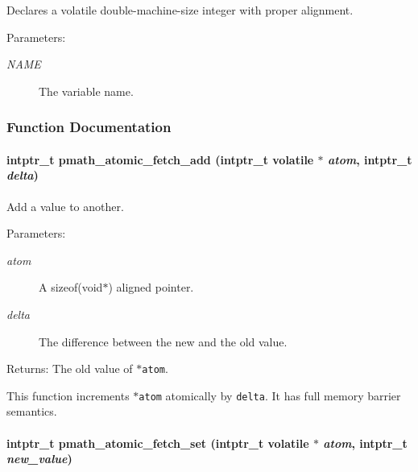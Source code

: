 Declares a volatile double-machine-size integer with proper alignment. 

\begin{Desc}
\item[Parameters:]
\begin{description}
\item[{\em NAME}]The variable name. \end{description}
\end{Desc}


\subsubsection{Function Documentation}
\hypertarget{group__atomic__ops_ge84bfddad2c018c6273b43164e6064ab}{
\paragraph[{pmath\_\-atomic\_\-fetch\_\-add}]{\setlength{\rightskip}{0pt plus 5cm}intptr\_\-t pmath\_\-atomic\_\-fetch\_\-add (intptr\_\-t volatile $\ast$ {\em atom}, \/  intptr\_\-t {\em delta})}\hfill}
\label{group__atomic__ops_ge84bfddad2c018c6273b43164e6064ab}


Add a value to another. 

\begin{Desc}
\item[Parameters:]
\begin{description}
\item[{\em atom}]A sizeof(void$\ast$) aligned pointer. \item[{\em delta}]The difference between the new and the old value. \end{description}
\end{Desc}
\begin{Desc}
\item[Returns:]The old value of {\tt $\ast$atom}.\end{Desc}
This function increments {\tt $\ast$atom} atomically by {\tt delta}. It has full memory barrier semantics. \hypertarget{group__atomic__ops_gc39a86500a2344c9c7f7f42d2d069334}{
\paragraph[{pmath\_\-atomic\_\-fetch\_\-set}]{\setlength{\rightskip}{0pt plus 5cm}intptr\_\-t pmath\_\-atomic\_\-fetch\_\-set (intptr\_\-t volatile $\ast$ {\em atom}, \/  intptr\_\-t {\em new\_\-value})}\hfill}
\label{group__atomic__ops_gc39a86500a2344c9c7f7f42d2d069334}


